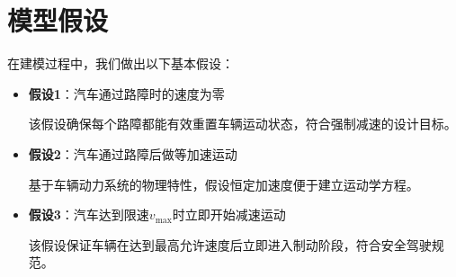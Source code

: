 \section{模型假设}\label{sec:Premise}

在建模过程中，我们做出以下基本假设：

\begin{itemize}
    \item \textbf{假设1}：汽车通过路障时的速度为零
    
    该假设确保每个路障都能有效重置车辆运动状态，符合强制减速的设计目标。

    \item \textbf{假设2}：汽车通过路障后做等加速运动
    
    基于车辆动力系统的物理特性，假设恒定加速度便于建立运动学方程。

    \item \textbf{假设3}：汽车达到限速$v_{\max}$时立即开始减速运动
    
    该假设保证车辆在达到最高允许速度后立即进入制动阶段，符合安全驾驶规范。

\end{itemize}
